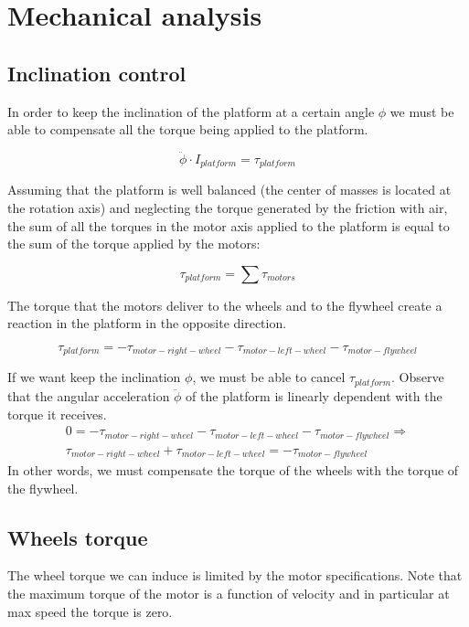 \section{Mechanical analysis}

\subsection{Inclination control}
In order to keep the inclination of the platform at a certain angle $\phi$ 
we must be able to compensate all the torque being applied to the platform.

\[\ddot{\phi}\cdot I_{platform} = \tau_{platform} \]

Assuming that the platform is well balanced (the center of masses is located
at the rotation axis) and neglecting the torque generated by the friction
with air, the sum of all the torques in the motor axis applied to the platform
is equal to the sum of the torque applied by the motors:

\[\tau_{platform} = \sum \tau_{motors}\]

The torque that the motors deliver to the wheels and to the flywheel create
a reaction in the platform in the opposite direction.

\[\tau_{platform} = -\tau_{motor-right-wheel} -\tau_{motor-left-wheel} -\tau_{motor-flywheel} \]

If we want keep the inclination $\phi$, we must be able to cancel $\tau_{platform}$.
Observe that the angular acceleration $\ddot{\phi}$ of the platform is linearly 
dependent with the torque it receives. 
\begin{equation} \label{eq:control equation}
\begin{split}
0 = -\tau_{motor-right-wheel} -\tau_{motor-left-wheel} -\tau_{motor-flywheel} \Rightarrow \\
\tau_{motor-right-wheel} +\tau_{motor-left-wheel} = -\tau_{motor-flywheel}
\end{split}
\end{equation}
In other words, we must compensate the torque of the wheels with the torque of the flywheel.

\subsection{Wheels torque}
The wheel torque we can induce is limited by the motor specifications. Note that the maximum torque of the motor is a function of velocity and in particular at max speed the torque is zero.

